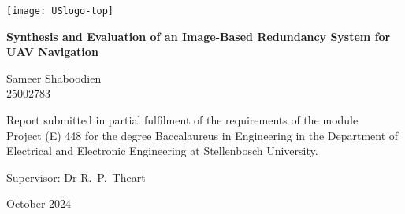 \graphicspath{{frontmatter/fig/}}

\begin{titlepage}
	\begin{center}
		
		\texttt{[image: USlogo-top]}
		
		\vfill
		
		{\sffamily \bfseries \huge Synthesis and Evaluation of an Image-Based Redundancy System for UAV Navigation \par}
		
		\vfill
		
		{\large {\Large Sameer Shaboodien} \\ 25002783 \par}
		
		\vfill
		
		\vfill
		
		{Report submitted in partial fulfilment of the requirements of the module \\
			Project (E) 448 for the degree Baccalaureus in Engineering in the Department of
			Electrical and Electronic Engineering at Stellenbosch University. \par}
		
		\vfill
		
		{\large {Supervisor}: Dr R.\ P.\ Theart} %
		
		\vfill
		
		{\Large October 2024}
	\end{center}
\end{titlepage}
